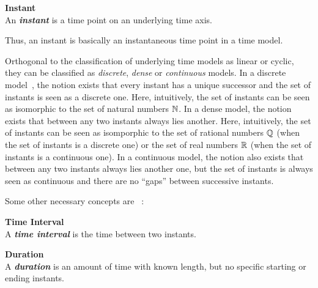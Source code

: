 \begin{svgraybox}
\vspace{-10pt}
\begin{definition}\textbf{Instant}~\cite{Dyreson1994}\\
An \emph{\textbf{instant}} is a time point on an underlying time axis.
\end{definition}
\vspace{-10pt}
\end{svgraybox}

Thus, an instant is basically an instantaneous time point in a time model.

Orthogonal to the classification of underlying time models as linear or cyclic, they can be classified as \emph{discrete}, \emph{dense} or \emph{continuous} models\cite{Dyreson1994}. In a discrete model~\cite{Clifford:1985:AHR:971699.318922}, the notion exists that every instant has a unique successor and the set of instants is seen as a discrete one. Here, intuitively, the set of instants can be seen as isomorphic to the set of natural numbers $\mathbb{N}$. In a dense model, the notion exists that between any two instants always lies another. Here, intuitively, the set of instants can be seen as isomporphic to the set of rational numbers $\mathbb{Q}$ (when the set of instants is a discrete one) or the set of real numbers $\mathbb{R}$ (when the set of instants is a continuous one). In a continuous model, the notion also exists that between any two instants always lies another one, but the set of instants is always seen as continuous and there are no ``gaps'' between successive instants.

Some other necessary concepts are ~\cite{Dyreson1994}:

\begin{svgraybox}
\vspace{-10pt}
\begin{definition}\textbf{Time Interval}\\
A \emph{\textbf{time interval}} is the time between two instants.
\end{definition}

\begin{definition}\textbf{Duration}\\
A \emph{\textbf{duration}} is an amount of time with known length, but no specific starting or ending instants.
\end{definition}
\vspace{-10pt}
\end{svgraybox}

